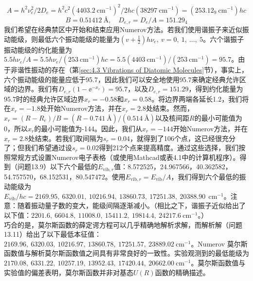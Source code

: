 \begin{examplebox}
\begin{equation*}
            A = h^2 \nu_e^2 / 2D_e = h^2 c^2 \left(4403.2 \:\mathrm{cm}^{-1}\right)^2 / 2hc \left(38297 \:\mathrm{cm}^{-1}\right) = \left(253.12_9 \:\mathrm{cm}^{-1}\right)hc
        \end{equation*}
        \begin{equation*}
            B = 0.51412 \:\mathrm{Å}, \quad D_{e,r} = D_e / A = 151.29_4
        \end{equation*}
        我们希望在经典禁区中开始和结束应用Numerov方法。若我们使用谐振子来近似振动能级，则最低六个振动能级的能量为$\left(v + \frac{1}{2}\right)h\nu_e,\: v = 0,\:1,\:\ldots,\:5$。六个谐振子振动能级的约化能量为$5.5h\nu_e/A = 5.5h\nu_e/\left(253\:\mathrm{cm}^{-1}\right)hc = 5.5\left(4403\:\mathrm{cm}^{-1}\right) / \left(253\:\mathrm{cm}^{-1}\right) = 95.7$。由于非谐性振动的存在（第\ref{sec:4.3 Vibrations of Diatomic Molecules}节），事实上，六个振动能级的能量应低于95.7，因此我们可以安全地使用95.7来确定经典允许区域的边界。我们有$D_{e,r}\left(1-\ee ^{-x_r}\right) = 95.7$，以及$D_{e,r} = 151.29$，得到约化能量为95.7时的经典允许区域边界$x_r = -0.58$和$x_r = 0.58$。将边界两端各延长1.2，我们将在$x_r = −1.8$处开始Numerov方法，并在$x_r = 2.8$处结束。然而，$x_r = \left(R - R_e\right)/B = \left(R - 0.741\:\mathrm{Å}\right)/\left(0.514\:\mathrm{Å}\right)$以及核间距$R$的最小可能值为0，所以$x_r$的最小可能值为-144。因此，我们从$x_r = -144$开始Numerov方法，并在$x_r = 2.8$处结束。若我们取间隔为$s_r = 0.04$，就得到了106个点，这已经很充分了；但我们希望通过设$s_r=0.02$得到212个点来提高精度。通过这些选择，我们按照常规方式设置Numerov电子表格（或使用Mathcad或表4.1中的计算机程序）。得到（问题13.9）以下六个最低的$E_{\text{vib},r}$值：8.572525，24.967566，40.362582，54.757570，68.152531，80.547472。使用$E_{\text{vib},r} = E_{\text{vib}}/A$，我们得到六个最低的振动能级为$E_{\text{vib}} / h c=2169.95,\:6320.01,\:10216.94,\:13860.73,\:17251.38,\:20388.90 \:\mathrm{~cm}^{-1}$。注意：随着振动量子数的变大，能级间隔逐渐减小。（相比之下，谐振子近似给出了以下值：$2201.6, \:6604.8, \:11008.0, \:15411.2, \:19814.4, \:24217.6 \:\mathrm{cm}^{-1}$。）\\
        巧合的是，莫尔斯函数的薛定谔方程可以几乎精确地解析求解，而解析解（问题13.11）给出了以下最低本征值：$2169.96,\:6320.03,\:10216.97,\:13860.78,\:17251.57,\:23889.02\:\mathrm{cm}^{-1}$。Numerov 莫尔斯函数值与解析莫尔斯函数值之间具有非常良好的一致性。实验观测到的最低能级为$2170.08,\:6331.22,\:10257.19,\:13952.43,\:17420.44,\:20662.00\:\mathrm{cm}^{-1}$。莫尔斯函数值与实验值的偏差表明，莫尔斯函数并非对基态$U\left(R\right)$函数的精确描述。


\end{examplebox}
